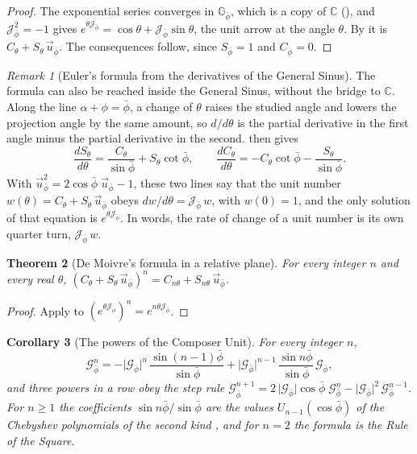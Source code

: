 \documentclass[11pt,a4paper]{amsart}
\theoremstyle{plain}
\newtheorem{theorem}{Theorem}[section]
\newtheorem{corollary}[theorem]{Corollary}
\theoremstyle{definition}
\theoremstyle{remark}
\newtheorem{remark}[theorem]{Remark}
\newcommand{\pb}{\bar{\phi}}                     %
\newcommand{\Gp}{\mathcal{G}_{\bar{\phi}}}       %
\newcommand{\up}{\vec{u}_{\bar{\phi}}}           %
\newcommand{\Jp}{\mathcal{J}_{\bar{\phi}}}       %
\newcommand{\GNp}{\mathbb{G}_{\bar{\phi}}}       %
\newcommand{\C}{\mathbb{C}}
\begin{document}
\begin{proof}
The exponential series converges in $\GNp$, which is a copy of $\C$ (), and $\Jp^2 = -1$ gives $e^{\theta\Jp} = \cos\theta + \Jp\sin\theta$, the unit arrow at the angle $\theta$. By  it is $C_\theta + S_\theta\,\up$. The consequences follow, since $S_{\pb} = 1$ and $C_{\pb} = 0$.
\end{proof}

\begin{remark}[Euler's formula from the derivatives of the General Sinus]\label{rem:euler-native}
The formula can also be reached inside the General Sinus, without the bridge to $\C$. Along the line $\alpha + \phi = \pb$, a change of $\theta$ raises the studied angle and lowers the projection angle by the same amount, so $d/d\theta$ is the partial derivative in the first angle minus the partial derivative in the second.  then gives
\[
\frac{dS_\theta}{d\theta} = \frac{C_\theta}{\sin\pb} + S_\theta\cot\pb , \qquad \frac{dC_\theta}{d\theta} = -C_\theta\cot\pb - \frac{S_\theta}{\sin\pb} .
\]
With $\up^2 = 2\cos\pb\;\up - 1$, these two lines say that the unit number $w(\theta) = C_\theta + S_\theta\,\up$ obeys $dw/d\theta = \Jp\,w$, with $w(0) = 1$, and the only solution of that equation is $e^{\theta\Jp}$. In words, the rate of change of a unit number is its own quarter turn, $\Jp\,w$.
\end{remark}

\begin{theorem}[De Moivre's formula in a relative plane]\label{thm:de-moivre}
For every integer $n$ and every real $\theta$, $(C_\theta + S_\theta\,\up)^n = C_{n\theta} + S_{n\theta}\,\up$.
\end{theorem}

\begin{proof}
Apply  to $(e^{\theta\Jp})^n = e^{n\theta\Jp}$.
\end{proof}

\begin{corollary}[The powers of the Composer Unit]\label{cor:powers}
For every integer $n$,
\[
\Gp^n = -\lvert\Gp\rvert^n\,\frac{\sin(n - 1)\pb}{\sin\pb} + \lvert\Gp\rvert^{n-1}\,\frac{\sin n\pb}{\sin\pb}\,\Gp ,
\]
and three powers in a row obey the step rule $\Gp^{n+1} = 2\,\lvert\Gp\rvert\cos\pb\;\Gp^n - \lvert\Gp\rvert^2\,\Gp^{n-1}$. For $n \geq 1$ the coefficients $\sin n\pb/\sin\pb$ are the values $U_{n-1}(\cos\pb)$ of the Chebyshev polynomials of the second kind \citep{MasonHandscomb2003}, and for $n = 2$ the formula is the Rule of the Square.
\end{corollary}
\end{document}
